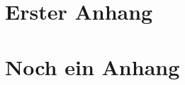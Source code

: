 \begin{appendix}


   
    \section{Erster Anhang}
    
    \section{Noch ein Anhang}
    
    
\end{appendix}



